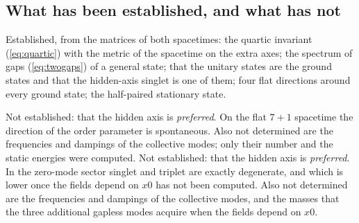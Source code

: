 \subsection{What has been established, and what has not}

Established, from the matrices of both spacetimes: the quartic invariant (\ref{eq:quartic}) with the
metric of the spacetime on the extra axes; the spectrum of gaps (\ref{eq:twogaps}) of a general
state; that the unitary states are the ground states and that the hidden-axis singlet is one of them;
four flat directions around every ground state; the half-paired stationary state.

Not established: that the hidden axis is \emph{preferred}. On the flat $7+1$ spacetime the direction
of the order parameter is spontaneous. Also not determined are the frequencies and dampings of the
collective modes; only their number and the static energies were computed.
Not established: that the hidden axis is \emph{preferred}. In the zero-mode sector singlet and
triplet are exactly degenerate, and which is lower once the fields depend on $x0$ has not been
computed. Also not determined are the frequencies and dampings of the collective modes, and the
masses that the three additional gapless modes acquire when the fields depend on $x0$.
